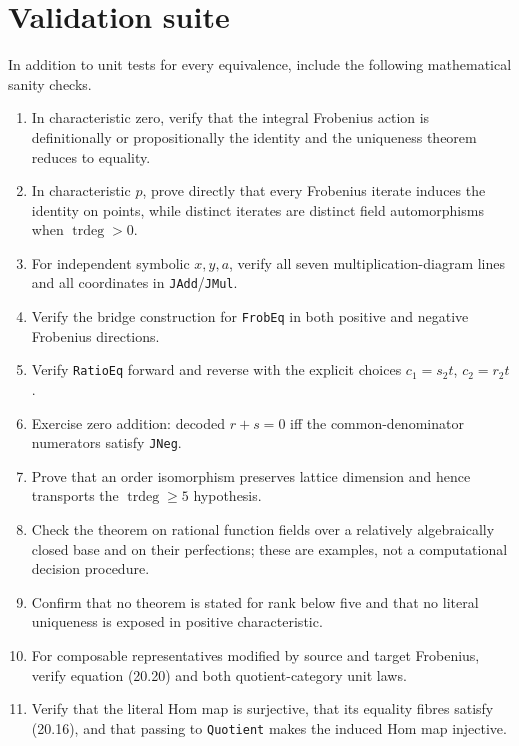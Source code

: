 \documentclass[11pt,oneside]{article}
\theoremstyle{definition}
\theoremstyle{remark}
\newcommand{\trdeg}{\operatorname{trdeg}}
\newcommand{\lean}[1]{\nolinkurl{#1}}
\begin{document}
\section{Validation suite}

In addition to unit tests for every equivalence, include the following mathematical sanity
checks.

\begin{enumerate}[label=\textbf{TEST-\arabic*.},leftmargin=15mm]
\item In characteristic zero, verify that the integral Frobenius action is definitionally
or propositionally the identity and the uniqueness theorem reduces to equality.
\item In characteristic $p$, prove directly that every Frobenius iterate induces the
identity on points, while distinct iterates are distinct field automorphisms when
$\trdeg>0$.
\item For independent symbolic $x,y,a$, verify all seven multiplication-diagram lines and
all coordinates in \lean{JAdd}/\lean{JMul}.
\item Verify the bridge construction for \lean{FrobEq} in both positive and negative
Frobenius directions.
\item Verify \lean{RatioEq} forward and reverse with the explicit choices
$c_1=s_2t$, $c_2=r_2t$.
\item Exercise zero addition: decoded $r+s=0$ iff the common-denominator numerators satisfy
\lean{JNeg}.
\item Prove that an order isomorphism preserves lattice dimension and hence transports the
$\trdeg\geq5$ hypothesis.
\item Check the theorem on rational function fields over a relatively algebraically closed
base and on their perfections; these are examples, not a computational decision procedure.
\item Confirm that no theorem is stated for rank below five and that no literal uniqueness
is exposed in positive characteristic.
\item For composable representatives modified by source and target Frobenius, verify
equation (20.20) and both quotient-category unit laws.
\item Verify that the literal Hom map is surjective, that its equality fibres satisfy
(20.16), and that passing to \lean{Quotient} makes the induced Hom map injective.
\end{enumerate}
\end{document}
